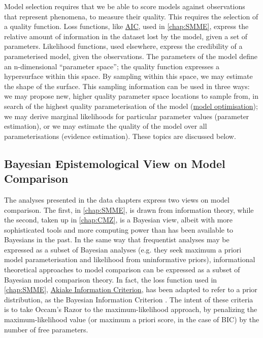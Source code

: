 Model selection requires that we be able to score models against observations that represent phenomena, to measure their quality. This requires the selection of a quality function. Loss functions, like \hyperref[ssec:AIC]{AIC}, used in \autoref{chap:SMME}, express the relative amount of information in the dataset lost by the model, given a set of parameters. Likelihood functions, used elsewhere, express the credibility of a parameterised model, given the observations. The parameters of the model define an n-dimensional ``parameter space''; the quality function expresses a hypersurface within this space. By sampling within this space, we may estimate the shape of the surface. This sampling information can be used in three ways: we may propose new, higher quality parameter space locations to sample from, in search of the highest quality parameterisation of the model (\hyperref[ssec:MLE]{model optimisation}); we may derive marginal likelihoods for particular parameter values (parameter estimation), or we may estimate the quality of the model over all parameterisations (evidence estimation). These topics are discussed below.

\subsection{Bayesian Epistemological View on Model Comparison}
\label{ssec:BayesEpistemology}
The analyses presented in the data chapters express two views on  model comparison. The first, in \autoref{chap:SMME}, is drawn from information theory, while the second, taken up in \autoref{chap:CMZ}, is a Bayesian view, albeit with more sophisticated tools and more computing power than has been available to Bayesians in the past. In the same way that frequentist analyses may be expressed as a subset of Bayesian analyses (e.g. they seek maximum a priori model parameterisation and likelihood from uninformative priors), informational theoretical approaches to model comparison can be expressed as a subset of Bayesian model comparison theory. In fact, the loss function used in \autoref{chap:SMME}, \hyperref[ssec:AIC]{Akiake Information Criterion}, has been adapted to refer to a prior distribution, as the Bayesian Information Criterion \cite{Posada2004}. The intent of these criteria is to take Occam's Razor to the maximum-likelihood approach, by penalizing the maximum-likelihood value (or maximum a priori score, in the case of BIC) by the number of free parameters.

